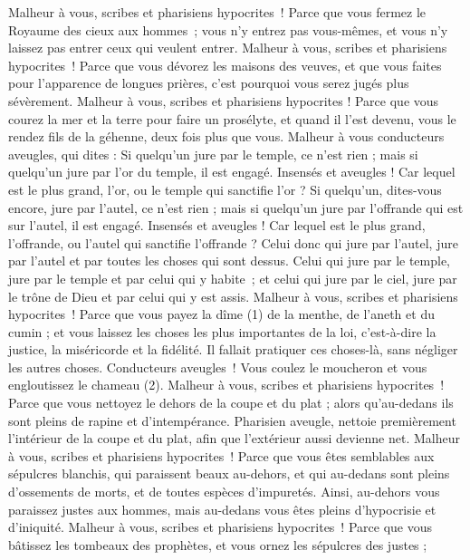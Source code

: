 \begin{multicols}{2}
{Malheur à vous, scribes et pharisiens hypocrites ! Parce que vous fermez le Royaume des cieux aux hommes ; vous n'y entrez pas vous-mêmes, et vous n’y laissez pas entrer ceux qui veulent entrer.
Malheur à vous, scribes et pharisiens hypocrites ! Parce que vous dévorez les maisons des veuves, et que vous faites pour l’apparence de longues prières, c'est pourquoi vous serez jugés plus sévèrement.
Malheur à vous, scribes et pharisiens hypocrites ! Parce que vous courez la mer et la terre pour faire un prosélyte, et quand il l'est devenu, vous le rendez fils de la géhenne, deux fois plus que vous.
Malheur à vous conducteurs aveugles, qui dites : Si quelqu’un jure par le temple, ce n'est rien ; mais si quelqu’un jure par l'or du temple, il est engagé.
Insensés et aveugles ! Car lequel est le plus grand, l'or, ou le temple qui sanctifie l'or ?
Si quelqu’un, dites-vous encore, jure par l'autel, ce n'est rien ; mais si quelqu’un jure par l’offrande qui est sur l'autel, il est engagé.
Insensés et aveugles ! Car lequel est le plus grand, l’offrande, ou l'autel qui sanctifie l’offrande ?
Celui donc qui jure par l'autel, jure par l'autel et par toutes les choses qui sont dessus.
Celui qui jure par le temple, jure par le temple et par celui qui y habite ;
et celui qui jure par le ciel, jure par le trône de Dieu et par celui qui y est assis.
Malheur à vous, scribes et pharisiens hypocrites ! Parce que vous payez la dîme (1) de la menthe, de l'aneth et du cumin ; et vous laissez les choses les plus importantes de la loi, c'est-à-dire la justice, la miséricorde et la fidélité. Il fallait pratiquer ces choses-là, sans négliger les autres choses.
Conducteurs aveugles ! Vous coulez le moucheron et vous engloutissez le chameau (2).
Malheur à vous, scribes et pharisiens hypocrites ! Parce que vous nettoyez le dehors de la coupe et du plat ; alors qu’au-dedans ils sont pleins de rapine et d'intempérance.
Pharisien aveugle, nettoie premièrement l’intérieur de la coupe et du plat, afin que l’extérieur aussi devienne net.
Malheur à vous, scribes et pharisiens hypocrites ! Parce que vous êtes semblables aux sépulcres blanchis, qui paraissent beaux au-dehors, et qui au-dedans sont pleins d'ossements de morts, et de toutes espèces d’impuretés.
Ainsi, au-dehors vous paraissez justes aux hommes, mais au-dedans vous êtes pleins d'hypocrisie et d'iniquité.
Malheur à vous, scribes et pharisiens hypocrites ! Parce que vous bâtissez les tombeaux des prophètes, et vous ornez les sépulcres des justes ;
}
\end{multicols}
